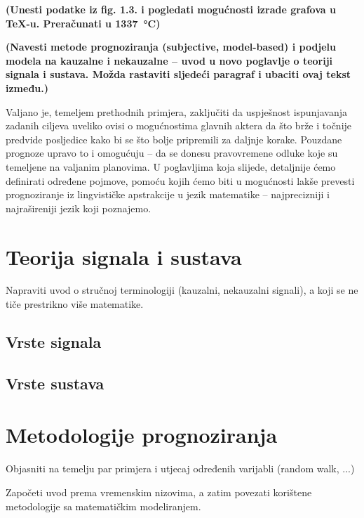 \documentclass[a4paper,12pt,oneside]{memoir}
\begin{document}
        \textbf{(Unesti podatke iz fig. 1.3. i pogledati mogućnosti izrade grafova u TeX-u. Preračunati u \SI{1337}{\celsius})}

        \textbf{(Navesti metode prognoziranja (subjective, model-based) i podjelu modela na kauzalne i nekauzalne -- uvod u novo poglavlje o teoriji signala i sustava. Možda rastaviti sljedeći paragraf i ubaciti ovaj tekst između.)}



        Valjano je, temeljem prethodnih primjera, zaključiti da uspješnost ispunjavanja zadanih ciljeva uveliko ovisi o mogućnostima glavnih aktera da što brže i točnije predvide posljedice kako bi se što bolje pripremili za daljnje korake. Pouzdane prognoze upravo to i omogućuju -- da se donesu pravovremene odluke koje su temeljene na valjanim planovima. U poglavljima koja slijede, detaljnije ćemo definirati određene pojmove, pomoću kojih ćemo biti u mogućnosti lakše prevesti prognoziranje iz lingvističke apstrakcije u jezik matematike -- najprecizniji i najrašireniji jezik koji poznajemo.

        \section{Teorija signala i sustava}
            Napraviti uvod o stručnoj terminologiji (kauzalni, nekauzalni signali), a koji se ne tiče prestrikno više matematike.
            \subsection{Vrste signala}
            \subsection{Vrste sustava}
        \section{Metodologije prognoziranja} %
            Objasniti na temelju par primjera i utjecaj određenih varijabli (random walk, ...)

            Započeti uvod prema vremenskim nizovima, a zatim povezati korištene metodologije sa matematičkim modeliranjem.
\end{document}
